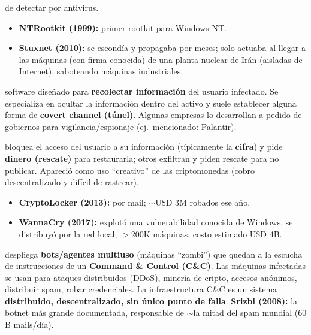 \documentclass[../main.tex]{subfiles}
\begin{document}
\begin{description}
        de detectar por antivirus.
        \begin{itemize}[noitemsep]
          \item \textbf{NTRootkit (1999):} primer rootkit para Windows NT.
          \item \textbf{Stuxnet (2010):} se escondía y propagaba por meses; solo
                actuaba al llegar a las máquinas (con firma conocida) de una planta
                nuclear de Irán (aisladas de Internet), saboteando máquinas
                industriales.
        \end{itemize}
  \item[Spyware:] software diseñado para \textbf{recolectar información} del usuario
        infectado. Se especializa en ocultar la información dentro del activo y suele
        establecer alguna forma de \textbf{covert channel (túnel)}. Algunas empresas
        lo desarrollan a pedido de gobiernos para vigilancia/espionaje (ej.\
        mencionado: Palantir).
  \item[Ransomware:] bloquea el acceso del usuario a su información (típicamente la
        \textbf{cifra}) y pide \textbf{dinero (rescate)} para restaurarla; otros
        exfiltran y piden rescate para no publicar. Apareció como uso ``creativo''
        de las criptomonedas (cobro descentralizado y difícil de rastrear).
        \begin{itemize}[noitemsep]
          \item \textbf{CryptoLocker (2013):} por mail; $\sim$U\$D 3M robados ese año.
          \item \textbf{WannaCry (2017):} explotó una vulnerabilidad conocida de
                Windows, se distribuyó por la red local; $>200$K máquinas, costo
                estimado U\$D 4B.
        \end{itemize}
  \item[Botnet:] despliega \textbf{bots/agentes multiuso} (máquinas ``zombi'') que
        quedan a la escucha de instrucciones de un \textbf{Command \& Control (C\&C)}.
        Las máquinas infectadas se usan para ataques distribuidos (DDoS), minería de
        cripto, accesos anónimos, distribuir spam, robar credenciales. La
        infraestructura C\&C es un sistema \textbf{distribuido, descentralizado, sin
        único punto de falla}. \textbf{Srizbi (2008):} la botnet más grande
        documentada, responsable de $\sim$la mitad del spam mundial ($60$B mails/día).
\end{description}
\end{document}

